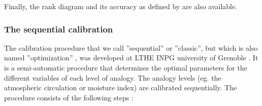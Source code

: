 \documentclass[review]{elsarticle}
\begin{document}
Finally, the rank diagram \citep{Talagrand1997} and its accuracy as defined by \citet{Candille2005} are also available.


\subsubsection{The sequential calibration}
\label{sec:atmoswing-calibration}

The calibration procedure that we call ''sequential'' or ''classic'', but which is also named ''optimization'' \cite[eg. by ][]{BenDaoud2015}, was developed at LTHE \textendash INPG university of Grenoble \citep{Bontron2004}. It is a semi-automatic procedure that determines the optimal parameters for the different variables of each level of analogy. The analogy levels (eg. the atmospheric circulation or moisture index) are calibrated sequentially. The procedure consists of the following steps \citep{Bontron2004}:
\end{document}

